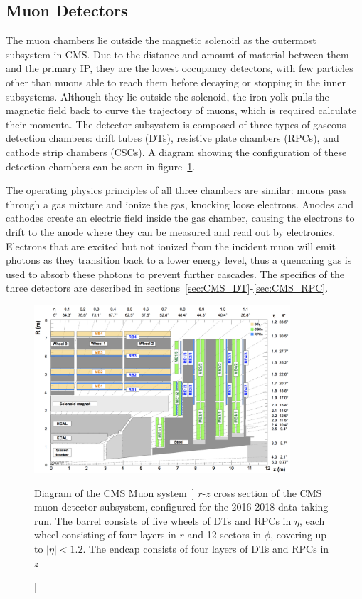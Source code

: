 \subsection{Muon Detectors} \label{sec:CMS_Muons}
The muon chambers lie outside the magnetic solenoid as the outermost subsystem in CMS. Due to the distance and amount of material between them and the primary IP, they are the lowest occupancy detectors, with few particles other than muons able to reach them before decaying or stopping in the inner subsystems. Although they lie outside the solenoid, the iron yolk pulls the magnetic field back to curve the trajectory of muons, which is required calculate their momenta. The detector subsystem is composed of three types of gaseous detection chambers: drift tubes (DTs), resistive plate chambers (RPCs), and cathode strip chambers (CSCs). A diagram showing the configuration of these detection chambers can be seen in figure~\ref{fig:Muons}.

The operating physics principles of all three chambers are similar: muons pass through a gas mixture and ionize the gas, knocking loose electrons. Anodes and cathodes create an electric field inside the gas chamber, causing the electrons to drift to the anode where they can be measured and read out by electronics. Electrons that are excited but not ionized from the incident muon will emit photons as they transition back to a lower energy level, thus a quenching gas is used to absorb these photons to prevent further cascades. The specifics of the three detectors are described in sections~\ref{sec:CMS_DT}-\ref{sec:CMS_RPC}.

\begin{figure}[htpb]
	\centering
	\includegraphics[width=0.85\textwidth]{figs/03_experiment/Muon_system.png}
	\caption
	[Diagram of the CMS Muon system~\cite{Sirunyan:2313130}]
	{$r$-$z$ cross section of the CMS muon detector subsystem, configured for the 2016-2018 data taking run. The barrel consists of five wheels of DTs and RPCs in $\eta$, each wheel consisting of four layers in $r$ and 12 sectors in $\phi$, covering up to $\left|\eta\right| < 1.2$. The endcap consists of four layers of DTs and RPCs in $z$~\cite{Sirunyan:2313130}}
	\label{fig:Muons}
\end{figure}

